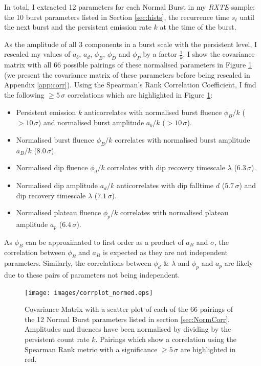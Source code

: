 \label{sec:NormCorr}

\par In total, I extracted 12 parameters for each Normal Burst in my \textit{RXTE} sample: the 10 burst parameters listed in Section \ref{sec:hists}, the recurrence time $s_t$ until the next burst and the persistent emission rate $k$ at the time of the burst.
\par As the amplitude of all 3 components in a burst scale with the persistent level, I rescaled my values of $a_b$, $a_d$, $\phi_B$, $\phi_D$ and $\phi_P$ by a factor $\frac{1}{k}$.  I show the covariance matrix with all 66 possible pairings of these normalised parameters in Figure \ref{fig:corr_n} (we present the covariance matrix of these parameters before being rescaled in Appendix \ref{app:corr}).  Using the Spearman's Rank Correlation Coefficient, I find the following $\geq5\,\sigma$ correlations which are highlighted in Figure \ref{fig:corr_n}:

\begin{itemize}
\item Persistent emission $k$ anticorrelates with normalised burst fluence $\phi_B/k$ ($>10\,\sigma$) and normalised burst amplitude $a_b/k$ ($>10\,\sigma$).
\item Normalised burst fluence $\phi_B/k$ correlates with normalised burst amplitude $a_B/k$ ($8.0\,\sigma$).
\item Normalised dip fluence $\phi_d/k$ correlates with dip recovery timescale $\lambda$ ($6.3\,\sigma$).
\item Normalised dip amplitude $a_d/k$ anticorrelates with dip falltime $d$ ($5.7\,\sigma$) and dip recovery timescale $\lambda$ ($7.1\,\sigma$).
\item Normalised plateau fluence $\phi_p/k$ correlates with normalised plateau amplitude $a_p$ ($6.4\,\sigma$).
\end{itemize}

As $\phi_B$ can be approximated to first order as a product of $a_B$ and $\sigma$, the correlation between $\phi_B$ and $a_B$ is expected as they are not independent parameters.  Similarly, the correlations between $\phi_d$ \& $\lambda$ and $\phi_p$ and $a_p$ are likely due to these pairs of parameters not being independent.

\begin{figure}
  \centering
  \texttt{[image: images/corrplot\_normed.eps]}
  \caption[Covariance Matrix with a scatter plot of each pairing of the 12 normalised Normal Burst parameters listed in section \ref{sec:NormCorr}.]{\small Covariance Matrix with a scatter plot of each of the 66 pairings of the 12 Normal Burst parameters listed in section \ref{sec:NormCorr}.  Amplitudes and fluences have been normalised by dividing by the persistent count rate $k$.  Pairings which show a correlation using the Spearman Rank metric with a significance $\geq5\,\sigma$ are highlighted in red.}
  \label{fig:corr_n}
\end{figure}

